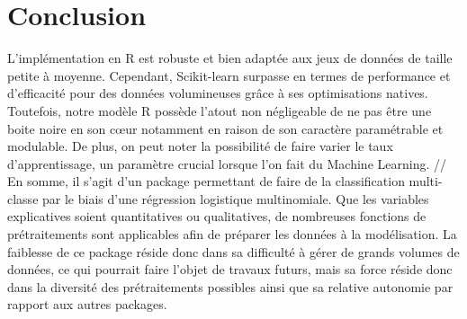 \documentclass[a4paper,12pt]{article}
\begin{document}
\section{Conclusion}
L'implémentation en R est robuste et bien adaptée aux jeux de données de taille petite à moyenne. Cependant, Scikit-learn surpasse en termes de performance et d'efficacité pour des données volumineuses grâce à ses optimisations natives. Toutefois, notre modèle R possède l'atout non négligeable de ne pas être une boite noire en son cœur notamment en raison de son caractère paramétrable et modulable. De plus, on peut noter la possibilité de faire varier le taux d'apprentissage, un paramètre crucial lorsque l'on fait du Machine Learning. //
En somme, il s'agit d'un package permettant de faire de la classification multi-classe par le biais d'une régression logistique multinomiale. Que les variables explicatives soient quantitatives ou qualitatives, de nombreuses fonctions de prétraitements sont applicables afin de préparer les données à la modélisation. La faiblesse de ce package réside donc dans sa difficulté à gérer de grands volumes de données, ce qui pourrait faire l'objet de travaux futurs, mais sa force réside donc dans la diversité des prétraitements possibles ainsi que sa relative autonomie par rapport aux autres packages.
\end{document}
